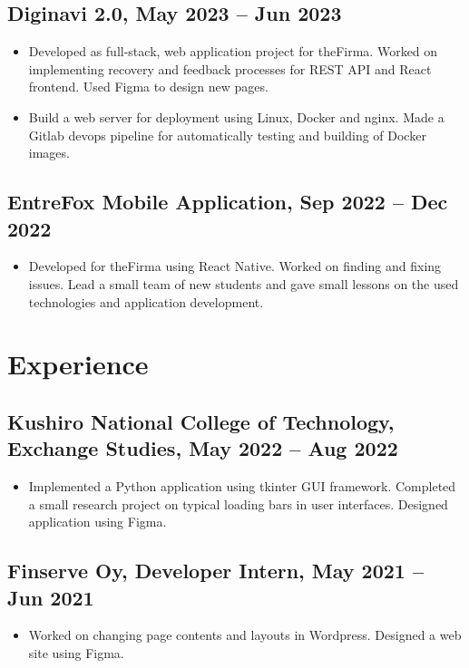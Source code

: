 \documentclass[a4paper,10pt]{article}
\begin{document}
\subsection*{Diginavi 2.0, May 2023 -- Jun 2023}
\begin{itemize}
    \item Developed as full-stack, web application project for theFirma. Worked on implementing recovery and feedback processes for REST API and React frontend. Used Figma to design new pages.
    \item Build a web server for deployment using Linux, Docker and nginx. Made a Gitlab devops pipeline for automatically testing and building of Docker images. 
\end{itemize}

\subsection*{EntreFox Mobile Application, Sep 2022 -- Dec 2022}
\begin{itemize}
    \item Developed for theFirma using React Native. Worked on finding and fixing issues. Lead a small team of new students and gave small lessons on the used technologies and application development.
\end{itemize}

\section*{Experience}
\subsection*{Kushiro National College of Technology, Exchange Studies, May 2022 -- Aug 2022}
\begin{itemize}
    \item Implemented a Python application using tkinter GUI framework. Completed a small research project on typical loading bars in user interfaces. Designed application using Figma.
\end{itemize}
\subsection*{Finserve Oy, Developer Intern, May 2021 -- Jun 2021}
\begin{itemize}
    \item Worked on changing page contents and layouts in Wordpress. Designed a web site using Figma.
\end{itemize}
\end{document}
